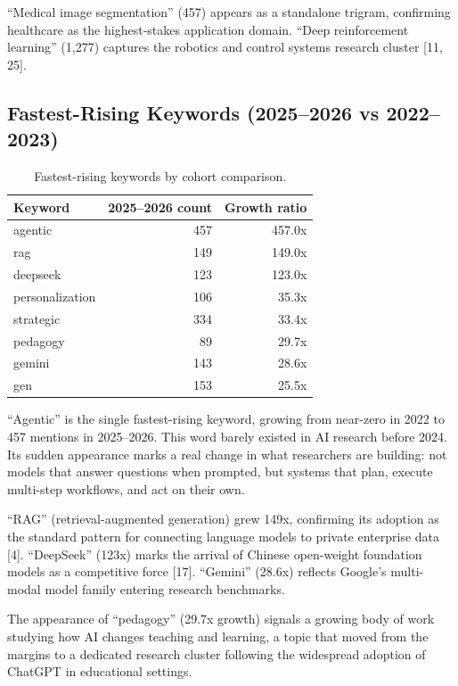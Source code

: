 \documentclass[11pt]{article}
\begin{document}
``Medical image segmentation'' (457) appears as a standalone trigram, confirming healthcare as the highest-stakes application domain. ``Deep reinforcement learning'' (1,277) captures the robotics and control systems research cluster [11, 25].

\subsection{Fastest-Rising Keywords (2025--2026 vs 2022--2023)}

\begin{table}[h]
\centering
\caption{Fastest-rising keywords by cohort comparison.}
\label{tab:rising}
\begin{tabular}{@{}lrr@{}}
\toprule
Keyword & 2025--2026 count & Growth ratio \\
\midrule
agentic & 457 & 457.0x \\
rag & 149 & 149.0x \\
deepseek & 123 & 123.0x \\
personalization & 106 & 35.3x \\
strategic & 334 & 33.4x \\
pedagogy & 89 & 29.7x \\
gemini & 143 & 28.6x \\
gen & 153 & 25.5x \\
\bottomrule
\end{tabular}
\end{table}

``Agentic'' is the single fastest-rising keyword, growing from near-zero in 2022 to 457 mentions in 2025--2026. This word barely existed in AI research before 2024. Its sudden appearance marks a real change in what researchers are building: not models that answer questions when prompted, but systems that plan, execute multi-step workflows, and act on their own.

``RAG'' (retrieval-augmented generation) grew 149x, confirming its adoption as the standard pattern for connecting language models to private enterprise data [4]. ``DeepSeek'' (123x) marks the arrival of Chinese open-weight foundation models as a competitive force [17]. ``Gemini'' (28.6x) reflects Google's multi-modal model family entering research benchmarks.

The appearance of ``pedagogy'' (29.7x growth) signals a growing body of work studying how AI changes teaching and learning, a topic that moved from the margins to a dedicated research cluster following the widespread adoption of ChatGPT in educational settings.
\end{document}
